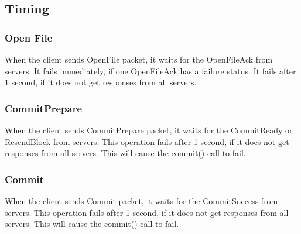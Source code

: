 \documentclass[11pt]{article} %
\begin{document}
\subsection{Timing}
\subsubsection{Open File}
When the client sends OpenFile packet, it waits for the OpenFileAck from servers.
It fails immediately, if one OpenFileAck has a failure status. 
It fails after 1 second, if it does not get responses from all servers.

\subsubsection{CommitPrepare}
When the client sends CommitPrepare packet, it waits for the CommitReady 
or ResendBlock from servers.
This operation fails after 1 second, if it does not get responses from all servers.
This will cause the commit() call to fail.

\subsubsection{Commit}
When the client sends Commit packet, it waits for the CommitSuccess from servers.
This operation fails after 1 second, if it does not get responses from all servers.
This will cause the commit() call to fail.
\end{document}
